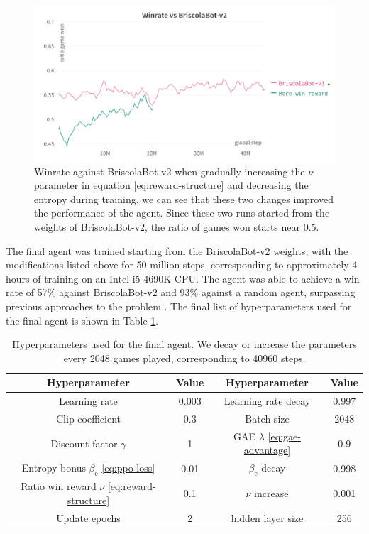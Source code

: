 \begin{figure}[H]
    \centering
    \includegraphics[width=\textwidth]{images/briscolabot-v3.png}
    \caption{Winrate against BriscolaBot-v2 when gradually increasing the $\nu$ parameter in equation \eqref{eq:reward-structure} and decreasing the entropy during training, we can see that these two changes improved the performance of the agent. Since these two runs started from the weights of BriscolaBot-v2, the ratio of games won starts near 0.5.}
    \label{fig:briscolabot-v3}
\end{figure}

The final agent was trained starting from the BriscolaBot-v2 weights, with the modifications listed above for 50 million steps, corresponding to approximately 4 hours of training on an Intel i5-4690K CPU. The agent was able to achieve a win rate of 57\% against BriscolaBot-v2 and 93\% against a random agent, surpassing previous approaches to the problem \cite{alsora-deep-briscola-dqn}. The final list of hyperparameters used for the final agent is shown in Table \ref{tab:hyperparam-final}.

\begin{table}[H]
    \centering
    \begin{tabular}{cccc}
        \hline
        Hyperparameter & Value & Hyperparameter & Value \\
        \hline
        Learning rate & 0.003 & Learning rate decay & 0.997 \\
        Clip coefficient & 0.3 & Batch size & 2048 \\
        Discount factor $\gamma$ & 1 & GAE $\lambda$ \eqref{eq:gae-advantage} & 0.9 \\
        Entropy bonus $\beta_\textrm{e}$ \eqref{eq:ppo-loss} & 0.01 & $\beta_\textrm{e}$ decay & 0.998 \\
        Ratio win reward $\nu$ \eqref{eq:reward-structure} & 0.1 & $\nu$ increase & 0.001 \\
        Update epochs & 2 & hidden layer size & 256
    \end{tabular}
    \caption{Hyperparameters used for the final agent. We decay or increase the parameters every 2048 games played, corresponding to 40960 steps.}
    \label{tab:hyperparam-final}
\end{table}

